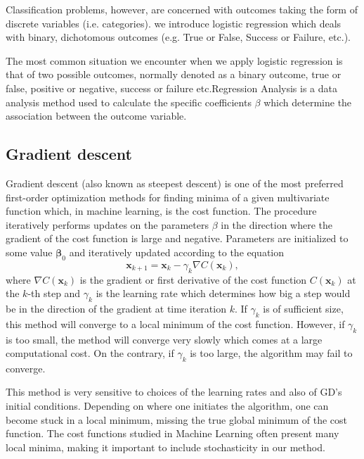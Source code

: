 \documentclass{emulateapj}
\begin{document}
Classification problems, however, are concerned with outcomes taking the form of discrete variables (i.e. categories).
we introduce
logistic regression which deals with binary, dichotomous
outcomes (e.g. True or False, Success or Failure, etc.).

The most common situation we encounter when we apply logistic regression is that of two possible outcomes, normally denoted as a binary outcome, true or false, positive or negative, success or failure etc.Regression Analysis is a data analysis method used to calculate the specific coefficients $\beta$ which determine the association between the outcome variable.
\fi

\subsection{Gradient descent}
Gradient descent (also known as steepest descent) is one of the most preferred first-order optimization methods for finding minima of a given multivariate function which, in machine learning, is the cost function. The procedure iteratively performs updates on the parameters $\beta$ in the direction where the gradient of the cost function is large and negative. Parameters are initialized to some value $\boldsymbol{\beta}_0$ and iteratively updated according to the equation
\begin{equation}
    \mathbf{x}_{k+1} = \mathbf{x}_k - \gamma_k \nabla C(\mathbf{x}_k),
\end{equation}
where $\nabla C(\mathbf{x}_k)$ is the gradient or first derivative of the cost function $C(\mathbf{x}_k)$ at the $k$-th step and $\gamma_k$ is the learning rate which determines how big a step would be in the direction of the gradient at time iteration $k$. If $\gamma_k$ is of sufficient size, this method will converge to a local minimum of the cost function. However, if $\gamma_k$ is too small, the method will converge very slowly which comes at a large computational cost. On the contrary, if $\gamma_k$ is too large, the algorithm  may fail to converge.

This method is very sensitive to choices of the learning rates and also of GD's initial conditions. Depending on where one initiates the algorithm, one can become stuck in a local minimum, missing the true global minimum of the cost function. The cost functions studied in Machine Learning often present many local minima, making it important to include stochasticity in our method.
\end{document}
